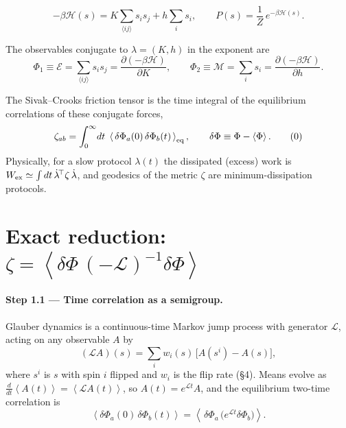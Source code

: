 \documentclass[11pt]{article}
\newcommand{\eq}{\mathcal{E}}
\newcommand{\mg}{\mathcal{M}}
\newcommand{\LL}{\mathcal{L}}
\newcommand{\HH}{\mathcal{H}}
\newcommand{\avg}[1]{\left\langle #1 \right\rangle}
\newcommand{\dPhi}{\delta\Phi}
\begin{document}
\begin{equation}
-\beta\HH(s)=K\!\!\sum_{\langle ij\rangle}\! s_is_j+h\sum_i s_i,
\qquad P(s)=\frac{1}{Z}\,e^{-\beta\HH(s)} .
\end{equation}

The observables conjugate to $\lambda=(K,h)$ in the exponent are
\begin{equation}
\Phi_1\equiv\eq=\!\!\sum_{\langle ij\rangle}\!s_is_j=\frac{\partial(-\beta\HH)}{\partial K},
\qquad
\Phi_2\equiv\mg=\sum_i s_i=\frac{\partial(-\beta\HH)}{\partial h}.
\end{equation}

The Sivak--Crooks friction tensor is the time integral of the equilibrium correlations of these
conjugate forces,
\begin{equation}
\zeta_{ab}=\int_0^\infty\!dt\;\avg{\,\dPhi_a(0)\,\dPhi_b(t)\,}_{\rm eq},
\qquad \dPhi\equiv\Phi-\avg{\Phi} .
\tag{0}\label{eq:zeta}
\end{equation}
Physically, for a slow protocol $\lambda(t)$ the dissipated (excess) work is
$W_{\rm ex}\simeq\int dt\,\dot\lambda^{\!\top}\zeta\,\dot\lambda$, and geodesics of the metric $\zeta$
are minimum-dissipation protocols.

\section{Exact reduction: \texorpdfstring{$\zeta=\avg{\dPhi\,(-\LL)^{-1}\dPhi}$}{zeta = <dPhi (-L)^-1 dPhi>}}

\paragraph{Step 1.1 --- Time correlation as a semigroup.}
Glauber dynamics is a continuous-time Markov jump process with generator $\LL$, acting on any
observable $A$ by
\begin{equation}
(\LL A)(s)=\sum_i w_i(s)\,\big[A(s^{i})-A(s)\big],
\end{equation}
where $s^{i}$ is $s$ with spin $i$ flipped and $w_i$ is the flip rate (\S4). Means evolve as
$\frac{d}{dt}\avg{A(t)}=\avg{\LL A(t)}$, so $A(t)=e^{\LL t}A$, and the equilibrium two-time
correlation is
\begin{equation}
\avg{\dPhi_a(0)\,\dPhi_b(t)}=\avg{\,\dPhi_a\,\big(e^{\LL t}\dPhi_b\big)} .
\end{equation}
\end{document}
